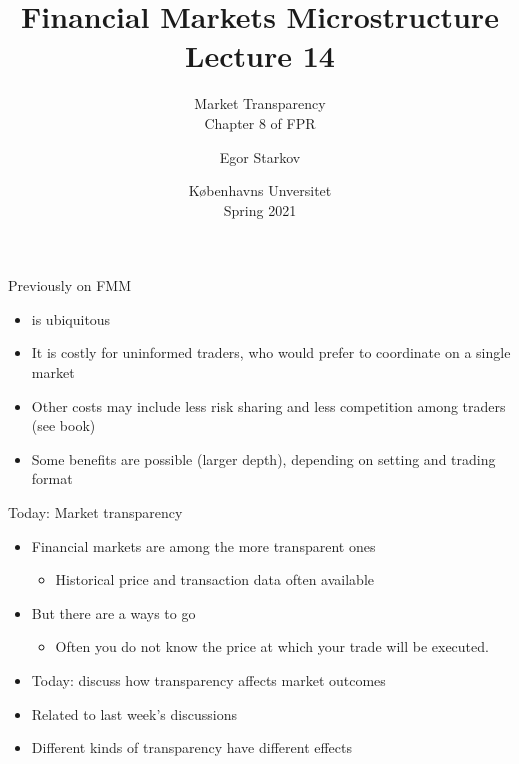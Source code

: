 \documentclass[english,10pt
,aspectratio=169
]{beamer}
\title{Financial Markets Microstructure \\ Lecture 14}
\subtitle{Market Transparency\\
	Chapter 8 of FPR}
\author{Egor Starkov}
\date{K{\o}benhavns Unversitet \\
	Spring 2021}
\begin{document}
\frame[plain]{\titlepage}


\begin{frame}{Previously on FMM}
	\begin{itemize}
		\item {} is ubiquitous 
		\item It is costly for uninformed traders, who would prefer to coordinate on a single market
		\item Other costs may include less risk sharing and less competition among traders (see book)
		\item Some benefits are possible (larger depth), depending on setting and trading format
	\end{itemize}
\end{frame}


\begin{frame}{Today: Market transparency}
	\begin{itemize}
		\item Financial markets are among the more transparent ones
		\begin{itemize}
			\item Historical price and transaction data often available
		\end{itemize}
		\item But there are a ways to go
		\begin{itemize}
			\item Often you do not know the price at which your trade will be executed.
		\end{itemize}
		\bigskip\pause
		\item Today: discuss how transparency affects market outcomes
		\item Related to last week's discussions
		\item Different kinds of transparency have different effects
	\end{itemize}
\end{frame}
\end{document}
